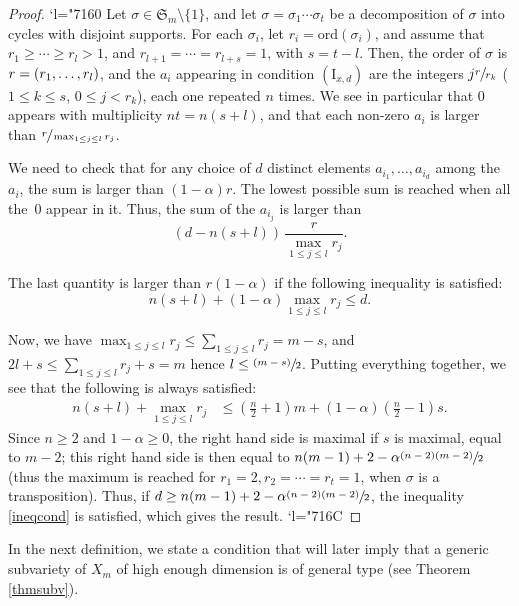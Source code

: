 \documentclass[JEP,XML,SOM,Unicode, NoEqCountersInSection,NoFloatCountersInSection,published]{cedram}
\newcommand{\Changel}{\mathcode`l="7160}
\newcommand{\Changelback}{\mathcode`l="716C}
\newcommand{\NoChangel}[1]{%
\expandafter\let\csname old\string#1\endcsname=#1
\let#1=\relax
\newcommand{#1}{\mathcode`l="716C\csname old\string#1\endcsname\mathcode`l="7160 }%
}
\newcommand{\psfrac}[2]{\sfrac{(#1)}{#2}}
\newcommand{\rI}{\mathrm{I}}
\DeclareMathOperator{\lcm}{lcm} \NoChangel{\lcm}
\theoremstyle{theorem}
\theoremstyle{definition}
\begin{document}
\begin{proof}
\Changel
Let $\sigma \in \mathfrak{S}_m \setminus \{ 1 \}$, and let $\sigma = \sigma_1 \cdots \sigma_t$ be a decomposition of $\sigma$ into cycles with disjoint supports. For each $\sigma_i$, let $r_i = \mathrm{ord}(\sigma_i)$, and assume that $r_1 \geq \cdots \geq r_l > 1$, and $r_{l+1} =\cdots= r_{l + s} = 1$, with $s = t - l$. Then, the order of $\sigma$ is $r = \lcm(r_1,\dots, r_l)$, and the $a_i$ appearing in condition $(\rI_{x, d})$ are the integers $j \sfrac{r}{r_k}$ ($1 \leq k \leq s$, $0 \leq j < r_k$), each one repeated $n$ times. We see in particular that $0$ appears with multiplicity $nt = n (s + l)$, and that each non-zero $a_i$ is larger than $\sfrac{r}{\max_{1 \leq j \leq l} r_j}$.

We need to check that for any choice of $d$ distinct elements $a_{i_1},\dots, a_{i_d}$ among the~$a_i$, the sum is larger than $(1 - \alpha)r$. The lowest possible sum is reached when all the~$0$ appear in it. Thus, the sum of the $a_{i_j}$ is larger than
\[
( d - n(s + l))\,\frac{r}{\max_{1 \leq j \leq l} r_j}.
\]

The last quantity is larger than $r(1 - \alpha)$ if the following inequality is satisfied:
\begin{equation} \label{ineqcond}
n (s + l) + (1 - \alpha) \max_{1 \leq j \leq l} r_j \leq d.
\end{equation}

Now, we have $\max_{1 \leq j \leq l} r_j \leq \sum_{1 \leq j \leq l} r_j = m - s$, and $2l + s \leq \sum_{1 \leq j \leq l} r_j + s = m$ hence $l \leq \psfrac{m-s}{2}$. Putting everything together, we see that the following is always satisfied:
\begin{align*}
n(s + l) + \max_{1 \leq j \leq l} r_j & \leq \left( \frac{n}{2} + 1 \right) m + (1 - \alpha) \left( \frac{n}{2} - 1 \right)s.
\end{align*}
Since $n \geq 2$ and $1 - \alpha \geq 0$, the right hand side is maximal if $s$ is maximal, equal to $m - 2$; this right hand side is then equal to $n(m-1) + 2 - \alpha \sfrac{(n-2)(m-2)}{2}$ (thus the maximum is reached for $r_1 = 2, r_2 =\cdots= r_t = 1$, \ie when $\sigma$ is a transposition). Thus, if $d \geq n(m-1) + 2 - \alpha \sfrac{(n-2)(m-2)}{2}$, the inequality \eqref{ineqcond} is satisfied, which gives the result.
\Changelback
\end{proof}

In the next definition, we state a condition that will later imply that a generic subvariety of $X_m$ of high enough dimension is of general type (see Theorem \ref{thmsubv}).
\end{document}
